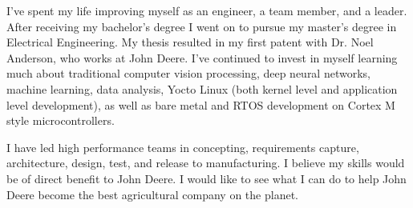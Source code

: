 \documentclass[11pt, a4paper]{awesome-cv}
\begin{document}
\begin{cvletter}
I've spent my life improving myself as an engineer, a team member, and a leader. After receiving my bachelor’s degree I went on to pursue my master’s degree in Electrical Engineering. My thesis resulted in my first patent with Dr. Noel Anderson, who works at John Deere. I've continued to invest in myself learning much about traditional computer vision processing, deep neural networks, machine learning, data analysis, Yocto Linux (both kernel level and application level development), as well as bare metal and RTOS development on Cortex M style microcontrollers.

I have led high performance teams in concepting, requirements capture, architecture, design, test, and release to manufacturing. I believe my skills would be of direct benefit to John Deere. I would like to see what I can do to help John Deere become the best agricultural company on the planet.

\end{cvletter}


\makeletterclosing
\end{document}

